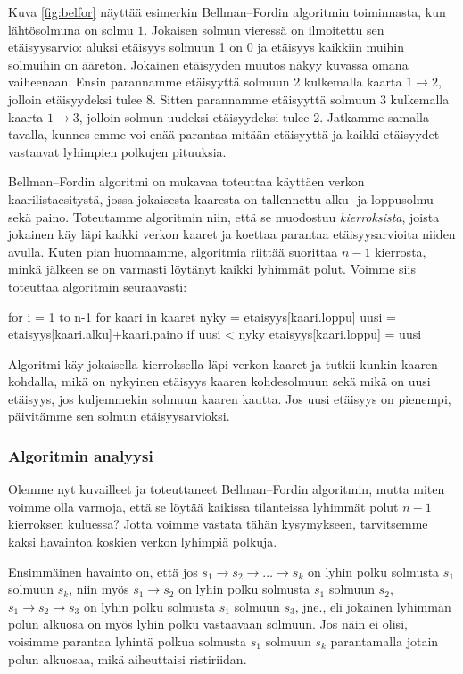 Kuva \ref{fig:belfor} näyttää esimerkin Bellman–Fordin algoritmin toiminnasta,
kun lähtösolmuna on solmu $1$.
Jokaisen solmun vieressä on ilmoitettu sen etäisyysarvio:
aluksi etäisyys solmuun 1 on 0 ja etäisyys kaikkiin muihin solmuihin on ääretön.
Jokainen etäisyyden muutos näkyy kuvassa omana vaiheenaan.
Ensin parannamme etäisyyttä solmuun 2
kulkemalla kaarta $1 \rightarrow 2$,
jolloin etäisyydeksi tulee $8$.
Sitten parannamme etäisyyttä solmuun $3$
kulkemalla kaarta $1 \rightarrow 3$,
jolloin solmun uudeksi etäisyydeksi tulee $2$.
Jatkamme samalla tavalla, kunnes emme voi enää parantaa
mitään etäisyyttä ja kaikki etäisyydet
vastaavat lyhimpien polkujen pituuksia.

Bellman–Fordin algoritmi on mukavaa toteuttaa
käyttäen verkon kaarilistaesitystä,
jossa jokaisesta kaaresta on tallennettu alku- ja loppusolmu sekä paino.
Toteutamme algoritmin niin,
että se muodostuu \emph{kierroksista},
joista jokainen käy läpi kaikki verkon kaaret
ja koettaa parantaa etäisyysarvioita niiden avulla.
Kuten pian huomaamme, algoritmia riittää suorittaa $n-1$
kierrosta, minkä jälkeen se on varmasti löytänyt
kaikki lyhimmät polut. Voimme siis toteuttaa algoritmin seuraavasti:

\begin{code}
for i = 1 to n-1
    for kaari in kaaret
        nyky = etaisyys[kaari.loppu]
        uusi = etaisyys[kaari.alku]+kaari.paino
        if uusi < nyky
            etaisyys[kaari.loppu] = uusi
\end{code}

Algoritmi käy jokaisella kierroksella läpi verkon kaaret
ja tutkii kunkin kaaren kohdalla,
mikä on nykyinen etäisyys kaaren kohdesolmuun
sekä mikä on uusi etäisyys, jos kuljemmekin solmuun kaaren kautta.
Jos uusi etäisyys on pienempi, päivitämme
sen solmun etäisyysarvioksi.

\subsubsection{Algoritmin analyysi}

Olemme nyt kuvailleet ja toteuttaneet Bellman–Fordin
algoritmin, mutta miten voimme olla varmoja,
että se löytää kaikissa tilanteissa lyhimmät polut $n-1$ kierroksen kuluessa?
Jotta voimme vastata tähän kysymykseen,
tarvitsemme kaksi havaintoa koskien verkon lyhimpiä polkuja.

Ensimmäinen havainto on, että jos
$s_1 \rightarrow s_2 \rightarrow \dots \rightarrow s_k$ on
lyhin polku solmusta $s_1$ solmuun $s_k$,
niin myös $s_1 \rightarrow s_2$ on lyhin polku solmusta $s_1$ solmuun $s_2$,
$s_1 \rightarrow s_2 \rightarrow s_3$ on lyhin polku solmusta $s_1$ solmuun $s_3$, jne.,
eli jokainen lyhimmän polun alkuosa on myös lyhin polku vastaavaan solmuun.
Jos näin ei olisi, voisimme parantaa lyhintä polkua solmusta $s_1$ solmuun $s_k$
parantamalla jotain polun alkuosaa, mikä aiheuttaisi ristiriidan.

